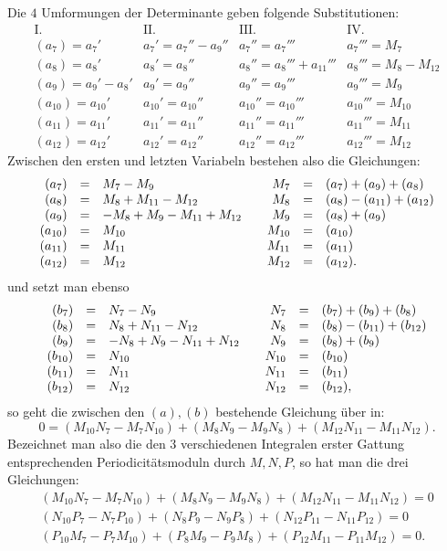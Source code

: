 \documentclass[10pt]{article}
\begin{document}
Die \(4\) Umformungen der Determinante geben folgende Substitutionen:
\[
\begin{array}{c|c|c|c}
\mathrm{I.}&\mathrm{II.}&\mathrm{III.}&\mathrm{IV.}\\
(a_7)=a_7'&a_7'=a_7''-a_9''&a_7''=a_7'''&a_7'''=M_7\\
(a_8)=a_8'&a_8'=a_8''&a_8''=a_8'''+a_{11}'''&a_8'''=M_8-M_{12}\\
(a_9)=a_9'-a_8'&a_9'=a_9''&a_9''=a_9'''&a_9'''=M_9\\
(a_{10})=a_{10}'&a_{10}'=a_{10}''&a_{10}''=a_{10}'''&a_{10}'''=M_{10}\\
(a_{11})=a_{11}'&a_{11}'=a_{11}''&a_{11}''=a_{11}'''&a_{11}'''=M_{11}\\
(a_{12})=a_{12}'&a_{12}'=a_{12}''&a_{12}''=a_{12}'''&a_{12}'''=M_{12}
\end{array}
\]
Zwischen den ersten und letzten Variabeln bestehen also die Gleichungen:
\[
\begin{array}{rcl@{\qquad}rcl}
(a_7)&=&M_7-M_9&M_7&=&(a_7)+(a_9)+(a_8)\\
(a_8)&=&M_8+M_{11}-M_{12}&M_8&=&(a_8)-(a_{11})+(a_{12})\\
(a_9)&=&-M_8+M_9-M_{11}+M_{12}&M_9&=&(a_8)+(a_9)\\
(a_{10})&=&M_{10}&M_{10}&=&(a_{10})\\
(a_{11})&=&M_{11}&M_{11}&=&(a_{11})\\
(a_{12})&=&M_{12}&M_{12}&=&(a_{12}).
\end{array}
\]
und setzt man ebenso
\[
\begin{array}{rcl@{\qquad}rcl}
(b_7)&=&N_7-N_9&N_7&=&(b_7)+(b_9)+(b_8)\\
(b_8)&=&N_8+N_{11}-N_{12}&N_8&=&(b_8)-(b_{11})+(b_{12})\\
(b_9)&=&-N_8+N_9-N_{11}+N_{12}&N_9&=&(b_8)+(b_9)\\
(b_{10})&=&N_{10}&N_{10}&=&(b_{10})\\
(b_{11})&=&N_{11}&N_{11}&=&(b_{11})\\
(b_{12})&=&N_{12}&N_{12}&=&(b_{12}),
\end{array}
\]
so geht die zwischen den \((a),(b)\) bestehende Gleichung über in:
\[
0=(M_{10}N_7-M_7N_{10})+(M_8N_9-M_9N_8)+(M_{12}N_{11}-M_{11}N_{12}).
\]
Bezeichnet man also die den \(3\) verschiedenen Integralen erster Gattung entsprechenden Periodicitätsmoduln durch \(M,N,P\), so hat man die drei Gleichungen:
\[
\begin{array}{l}
(M_{10}N_7-M_7N_{10})+(M_8N_9-M_9N_8)+(M_{12}N_{11}-M_{11}N_{12})=0\\
(N_{10}P_7-N_7P_{10})+(N_8P_9-N_9P_8)+(N_{12}P_{11}-N_{11}P_{12})=0\\
(P_{10}M_7-P_7M_{10})+(P_8M_9-P_9M_8)+(P_{12}M_{11}-P_{11}M_{12})=0.
\end{array}
\]
\end{document}
